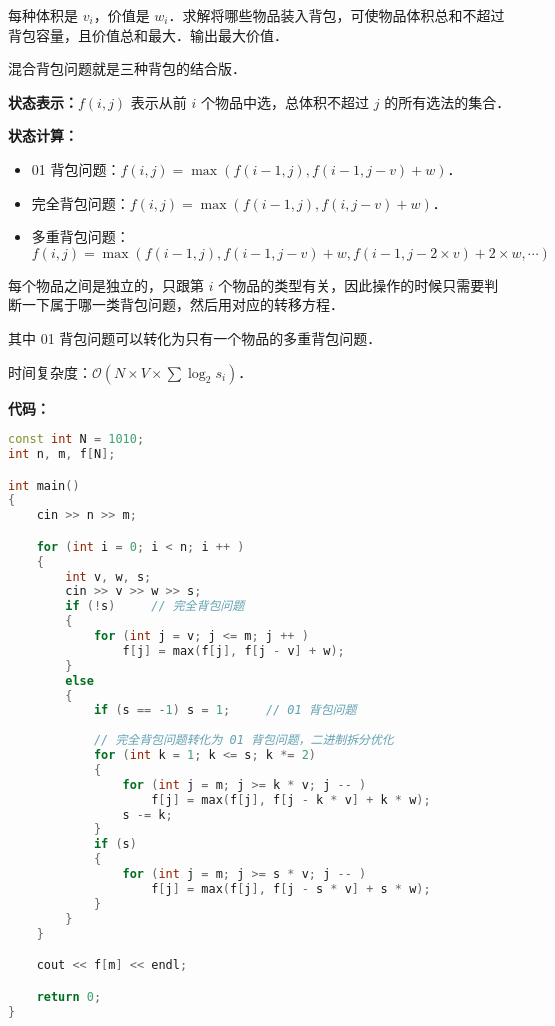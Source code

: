每种体积是 $v_i$，价值是 $w_i$．求解将哪些物品装入背包，可使物品体积总和不超过背包容量，且价值总和最大．输出最大价值．

混合背包问题就是三种背包的结合版．

\textbf{状态表示：$f(i, j)$} 表示从前 $i$ 个物品中选，总体积不超过 $j$ 的所有选法的集合．

\textbf{状态计算：}

\begin{itemize}
\item 01 背包问题：$f(i, j) = \max(f(i - 1, j), f(i - 1, j - v) + w)$．
\item 完全背包问题：$f(i, j) = \max(f(i - 1, j), f(i, j - v) + w)$．
\item 多重背包问题：
\begin{equation}
f(i, j) = \max(f(i - 1, j), f(i - 1, j - v) + w, f(i - 1, j - 2 \times v) + 2 \times w , \cdots)
\end{equation}
\end{itemize}

每个物品之间是独立的，只跟第 $i$ 个物品的类型有关，因此操作的时候只需要判断一下属于哪一类背包问题，然后用对应的转移方程．

其中 01 背包问题可以转化为只有一个物品的多重背包问题．

时间复杂度：$\mathcal{O}(N \times V \times \sum \log_2 s_i)$．

\textbf{代码：}

\begin{lstlisting}[language=cpp]
const int N = 1010;
int n, m, f[N];

int main()
{
    cin >> n >> m;

    for (int i = 0; i < n; i ++ )
    {
        int v, w, s;
        cin >> v >> w >> s;
        if (!s)     // 完全背包问题
        {
            for (int j = v; j <= m; j ++ )
                f[j] = max(f[j], f[j - v] + w);
        }
        else
        {
            if (s == -1) s = 1;     // 01 背包问题
            
            // 完全背包问题转化为 01 背包问题，二进制拆分优化
            for (int k = 1; k <= s; k *= 2)
            {
                for (int j = m; j >= k * v; j -- )
                    f[j] = max(f[j], f[j - k * v] + k * w);
                s -= k;
            }
            if (s)
            {
                for (int j = m; j >= s * v; j -- )
                    f[j] = max(f[j], f[j - s * v] + s * w);
            }
        }
    }

    cout << f[m] << endl;

    return 0;
}
\end{lstlisting}

